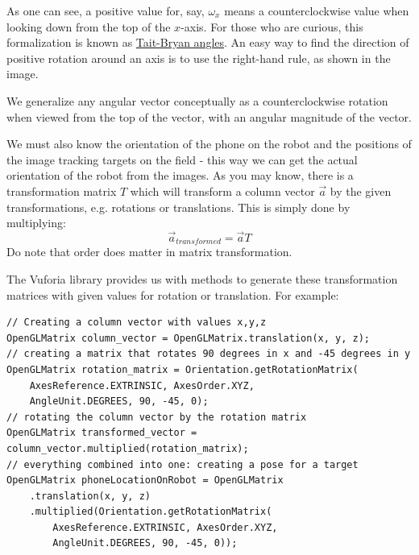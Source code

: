 \documentclass{article}
\begin{document}
As one can see, a positive value for, say, $\omega_x$ means a counterclockwise value when looking down from the top of the $x$-axis. For those who are curious, this formalization is known as \href{https://en.wikipedia.org/wiki/Euler_angles#Tait\%E2\%80\%93Bryan_angles}{Tait-Bryan angles}. An easy way to find the direction of positive rotation around an axis is to use the right-hand rule, as shown in the image.

We generalize any angular vector conceptually as a counterclockwise rotation when viewed from the top of the vector, with an angular magnitude of the vector.

We must also know the orientation of the phone on the robot and the positions of the image tracking targets on the field - this way we can get the actual orientation of the robot from the images. As you may know, there is a transformation matrix $T$ which will transform a column vector $\vec{a}$ by the given transformations, e.g. rotations or translations. This is simply done by multiplying:
\[
    \vec{a}_{transformed} = \vec{a}T
\]
Do note that order does matter in matrix transformation.


The Vuforia library provides us with methods to generate these transformation matrices with given values for rotation or translation. For example:
\clearpage
\begin{verbatim}
// Creating a column vector with values x,y,z
OpenGLMatrix column_vector = OpenGLMatrix.translation(x, y, z);
// creating a matrix that rotates 90 degrees in x and -45 degrees in y
OpenGLMatrix rotation_matrix = Orientation.getRotationMatrix(
    AxesReference.EXTRINSIC, AxesOrder.XYZ,
    AngleUnit.DEGREES, 90, -45, 0);
// rotating the column vector by the rotation matrix
OpenGLMatrix transformed_vector = column_vector.multiplied(rotation_matrix);
// everything combined into one: creating a pose for a target
OpenGLMatrix phoneLocationOnRobot = OpenGLMatrix
    .translation(x, y, z)
    .multiplied(Orientation.getRotationMatrix(
        AxesReference.EXTRINSIC, AxesOrder.XYZ,
        AngleUnit.DEGREES, 90, -45, 0));
\end{verbatim}
\end{document}

